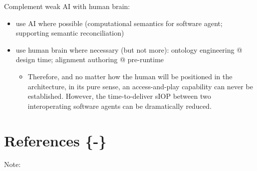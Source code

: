 \documentclass[sort&compress,preprint,authoryear,3p,twocolumn]{elsarticle}
\providecommand{\tightlist}{%
  \setlength{\itemsep}{0pt}\setlength{\parskip}{0pt}}
\begin{document}
Complement weak AI with human brain:

\begin{itemize}
\tightlist
\item
  use AI where possible (computational semantics for software agent;
  supporting semantic reconciliation)
\item
  use human brain where necessary (but not more): ontology engineering @
  design time; alignment authoring @ pre-runtime

  \begin{itemize}
  \tightlist
  \item
    Therefore, and no matter how the human will be positioned in the
    architecture, in its pure sense, an access-and-play capability can
    never be established. However, the time-to-deliver sIOP between two
    interoperating software agents can be dramatically reduced.
  \end{itemize}
\end{itemize}

\hypertarget{references--}{%
\section{References \{-\}}\label{references--}}

\setlength{\parindent}{-0.2in}

\setlength{\leftskip}{0.2in}

\setlength{\parskip}{8pt}

Note:



\end{document}
